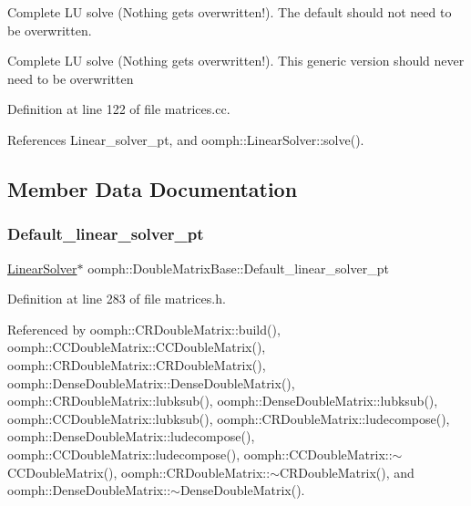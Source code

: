Complete LU solve (Nothing gets overwritten!). The default should not need to be overwritten. 

Complete LU solve (Nothing gets overwritten!). This generic version should never need to be overwritten 

Definition at line 122 of file matrices.\+cc.



References Linear\+\_\+solver\+\_\+pt, and oomph\+::\+Linear\+Solver\+::solve().



\subsection{Member Data Documentation}
\mbox{\label{classoomph_1_1DoubleMatrixBase_a6ef2e36e4e5907af2738934f131e8dcf}} 
\subsubsection{\texorpdfstring{Default\+\_\+linear\+\_\+solver\+\_\+pt}{Default\_linear\_solver\_pt}}
{\footnotesize\ttfamily \hyperlink{classoomph_1_1LinearSolver}{Linear\+Solver}$\ast$ oomph\+::\+Double\+Matrix\+Base\+::\+Default\+\_\+linear\+\_\+solver\+\_\+pt\hspace{0.3cm}{\ttfamily [protected]}}



Definition at line 283 of file matrices.\+h.



Referenced by oomph\+::\+C\+R\+Double\+Matrix\+::build(), oomph\+::\+C\+C\+Double\+Matrix\+::\+C\+C\+Double\+Matrix(), oomph\+::\+C\+R\+Double\+Matrix\+::\+C\+R\+Double\+Matrix(), oomph\+::\+Dense\+Double\+Matrix\+::\+Dense\+Double\+Matrix(), oomph\+::\+C\+R\+Double\+Matrix\+::lubksub(), oomph\+::\+Dense\+Double\+Matrix\+::lubksub(), oomph\+::\+C\+C\+Double\+Matrix\+::lubksub(), oomph\+::\+C\+R\+Double\+Matrix\+::ludecompose(), oomph\+::\+Dense\+Double\+Matrix\+::ludecompose(), oomph\+::\+C\+C\+Double\+Matrix\+::ludecompose(), oomph\+::\+C\+C\+Double\+Matrix\+::$\sim$\+C\+C\+Double\+Matrix(), oomph\+::\+C\+R\+Double\+Matrix\+::$\sim$\+C\+R\+Double\+Matrix(), and oomph\+::\+Dense\+Double\+Matrix\+::$\sim$\+Dense\+Double\+Matrix().

